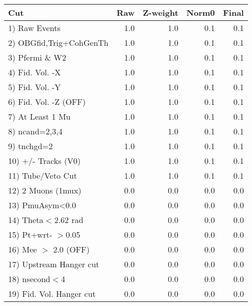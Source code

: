  \begin{table}[h!]\centering
 \begin{tabular}{||l||r|r|r|r||}
 \hline
 \hline
 Cut & Raw & Z-weight & Norm0 & Final \\
 \hline
  1) Raw Events           &         1.0 &         1.0 &         0.1 &         0.1 \\
  2) OBGfid,Trig+CohGenTh &         1.0 &         1.0 &         0.1 &         0.1 \\
  3) Pfermi \& W2         &         1.0 &         1.0 &         0.1 &         0.1 \\
  4) Fid. Vol. -X         &         1.0 &         1.0 &         0.1 &         0.1 \\
  5) Fid. Vol. -Y         &         1.0 &         1.0 &         0.1 &         0.1 \\
  6) Fid. Vol. -Z (OFF)   &         1.0 &         1.0 &         0.1 &         0.1 \\
  7) At Least 1 Mu        &         1.0 &         1.0 &         0.1 &         0.1 \\
  8) ncand=2,3,4          &         1.0 &         1.0 &         0.1 &         0.1 \\
  9) tnchgd=2             &         1.0 &         1.0 &         0.1 &         0.1 \\
 10) +/- Tracks (V0)      &         1.0 &         1.0 &         0.1 &         0.1 \\
 11) Tube/Veto Cut        &         1.0 &         1.0 &         0.1 &         0.1 \\
 12) 2 Muons (1mux)       &         0.0 &         0.0 &         0.0 &         0.0 \\
 13) PmuAsym<0.0          &         0.0 &         0.0 &         0.0 &         0.0 \\
 14) Theta$<$2.62 rad     &         0.0 &         0.0 &         0.0 &         0.0 \\
 15) Pt+wrt- $>$0.05      &         0.0 &         0.0 &         0.0 &         0.0 \\
 16) Mee $>$ 2.0  (OFF)   &         0.0 &         0.0 &         0.0 &         0.0 \\
 17) Upstream Hanger cut  &         0.0 &         0.0 &         0.0 &         0.0 \\
 18) nsecond$<$4          &         0.0 &         0.0 &         0.0 &         0.0 \\
 19) Fid. Vol. Hanger cut &         0.0 &         0.0 &         0.0 &         0.0 \\

\end{tabular}
\end{table}
